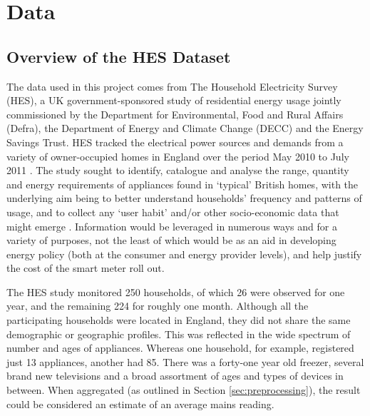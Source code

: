 \chapter{Data}


\section{Overview of the HES Dataset}
The data used in this project comes from The Household Electricity Survey (HES), a UK government-sponsored study of residential energy usage jointly commissioned by the Department for Environmental, Food and Rural Affairs (Defra), the Department of Energy and Climate Change (DECC) and the Energy Savings Trust.  HES tracked the electrical power sources and demands from a variety of owner-occupied homes in England over the period May 2010 to July 2011 \cite{HES,EST_1,EST_2}. The study sought to identify, catalogue and analyse the range, quantity and energy requirements of appliances found in `typical' British homes, with the underlying aim being to better understand households' frequency and patterns of usage, and to collect any `user habit' and/or other socio-economic data that might emerge \cite{EST_2,early_findings}.  Information would be leveraged in numerous ways and for a variety of purposes, not the least of which would be as an aid in developing energy policy (both at the consumer and energy provider levels), and help justify the cost of the smart meter roll out.   

The HES study monitored 250 households, of which 26 were observed for one year, and the remaining 224 for roughly one month. Although all the participating households were located in England, they did not share the same demographic or geographic profiles.   This was reflected in the wide spectrum of number and ages of appliances.  Whereas one household, for example, registered just 13 appliances, another had 85.  There was a forty-one year old freezer, several brand new televisions and a broad assortment of ages and types of devices in between. When aggregated (as outlined in Section \ref{sec:preprocessing}), the result could be considered an estimate of an average mains reading. 

